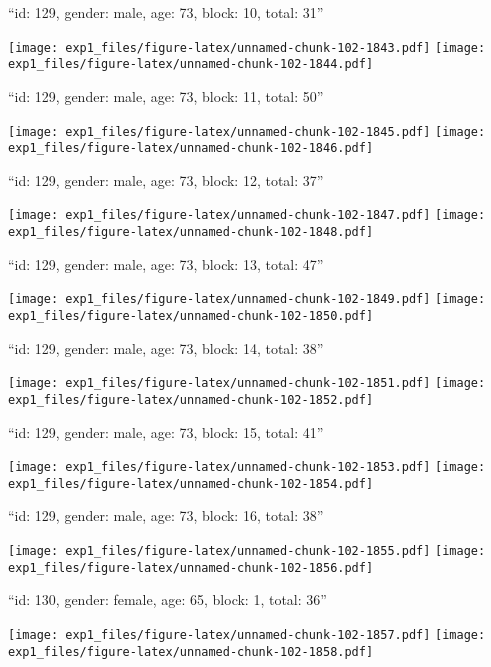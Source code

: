 \documentclass[11pt,,]{article}
\begin{document}
\newpage
[1] 

``id: 129, gender: male, age: 73, block: 10, total: 31''

\texttt{[image: exp1\_files/figure-latex/unnamed-chunk-102-1843.pdf]}
\texttt{[image: exp1\_files/figure-latex/unnamed-chunk-102-1844.pdf]}

\newpage
[1] 

``id: 129, gender: male, age: 73, block: 11, total: 50''

\texttt{[image: exp1\_files/figure-latex/unnamed-chunk-102-1845.pdf]}
\texttt{[image: exp1\_files/figure-latex/unnamed-chunk-102-1846.pdf]}

\newpage
[1] 

``id: 129, gender: male, age: 73, block: 12, total: 37''

\texttt{[image: exp1\_files/figure-latex/unnamed-chunk-102-1847.pdf]}
\texttt{[image: exp1\_files/figure-latex/unnamed-chunk-102-1848.pdf]}

\newpage
[1] 

``id: 129, gender: male, age: 73, block: 13, total: 47''

\texttt{[image: exp1\_files/figure-latex/unnamed-chunk-102-1849.pdf]}
\texttt{[image: exp1\_files/figure-latex/unnamed-chunk-102-1850.pdf]}

\newpage
[1] 

``id: 129, gender: male, age: 73, block: 14, total: 38''

\texttt{[image: exp1\_files/figure-latex/unnamed-chunk-102-1851.pdf]}
\texttt{[image: exp1\_files/figure-latex/unnamed-chunk-102-1852.pdf]}

\newpage
[1] 

``id: 129, gender: male, age: 73, block: 15, total: 41''

\texttt{[image: exp1\_files/figure-latex/unnamed-chunk-102-1853.pdf]}
\texttt{[image: exp1\_files/figure-latex/unnamed-chunk-102-1854.pdf]}

\newpage
[1] 

``id: 129, gender: male, age: 73, block: 16, total: 38''

\texttt{[image: exp1\_files/figure-latex/unnamed-chunk-102-1855.pdf]}
\texttt{[image: exp1\_files/figure-latex/unnamed-chunk-102-1856.pdf]}

\newpage
[1] 

``id: 130, gender: female, age: 65, block: 1, total: 36''

\texttt{[image: exp1\_files/figure-latex/unnamed-chunk-102-1857.pdf]}
\texttt{[image: exp1\_files/figure-latex/unnamed-chunk-102-1858.pdf]}
\end{document}
